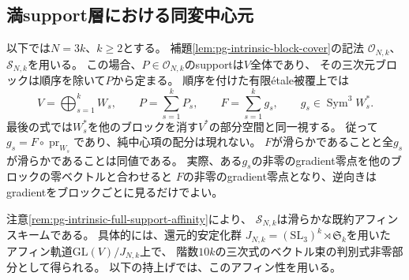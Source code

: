 \subsection{満support層における同変中心元}
以下では$N=3k$、$k\ge2$とする。
補題\ref{lem:pg-intrinsic-block-cover}の記法
$\mathcal O_{N,k}$、$\mathcal S_{N,k}$を用いる。
この場合、$P\in\mathcal O_{N,k}$のsupportは$V$全体であり、
その三次元ブロックは順序を除いて$P$から定まる。
順序を付けた有限\'{e}tale被覆上では
\begin{equation}
 V=\bigoplus_{s=1}^k W_s,\qquad
 P=\sum_{s=1}^kP_s,\qquad
 F=\sum_{s=1}^kg_s,\qquad
 g_s\in\operatorname{Sym}^3W_s^*.
 \label{eq:pg-full-support-canonical-blocks}
\end{equation}
最後の式では$W_s^*$を他のブロックを消す$V^*$の部分空間と同一視する。
従って$g_s=F\circ\operatorname{pr}_{W_s}$であり、純中心項の配分は現れない。
$F$が滑らかであることと全$g_s$が滑らかであることは同値である。
実際、ある$g_s$の非零のgradient零点を他のブロックの零ベクトルと合わせると
$F$の非零のgradient零点となり、逆向きはgradientをブロックごとに見るだけでよい。

注意\ref{rem:pg-intrinsic-full-support-affinity}により、
$\mathcal S_{N,k}$は滑らかな既約アフィンスキームである。
具体的には、還元的安定化群
$J_{N,k}=(\mathrm{SL}_3)^k\rtimes\mathfrak S_k$を用いた
アフィン軌道$\mathrm{GL}(V)/J_{N,k}$上で、
階数$10k$の三次式のベクトル束の判別式非零部分として得られる。
以下の持上げでは、このアフィン性を用いる。

